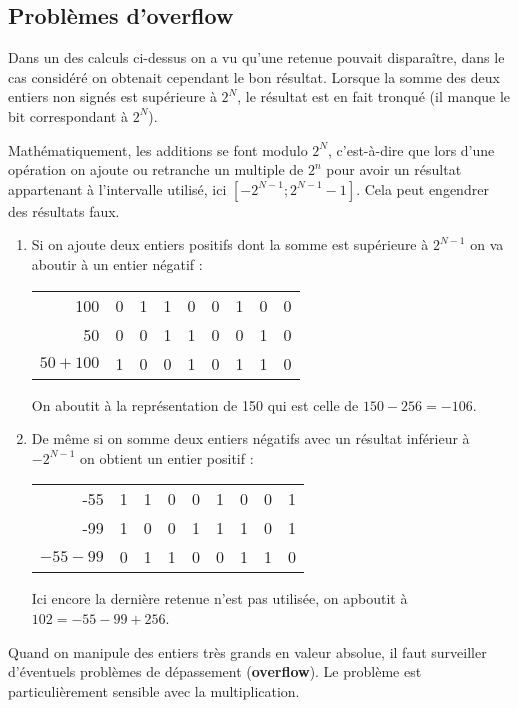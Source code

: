 \subsection{Problèmes d'overflow}
Dans un des calculs ci-dessus on a vu qu'une retenue pouvait disparaître, dans le cas considéré on obtenait cependant le bon résultat. Lorsque la somme des deux entiers non signés est supérieure à $2^N$, le résultat est en fait tronqué (il manque le bit correspondant à $2^N$).

Mathématiquement, les additions se font modulo $2^N$, c'est-à-dire que lors d'une opération on ajoute ou retranche un multiple de $2^n$ pour avoir un résultat appartenant à l'intervalle utilisé, ici $[-2^{N-1}; 2^{N-1}-1]$. Cela peut engendrer des résultats faux.
\begin{enumerate}
\item Si on ajoute deux entiers positifs dont la somme est supérieure à $2^{N-1}$ on va aboutir à un entier négatif :
\begin{center}
\begin{tabular}{r|cccccccc}
100      &0&1&1&0&0&1&0&0\\
50       &0&0&1&1&0&0&1&0\\
$50+100$ &1&0&0&1&0&1&1&0\\
\end{tabular}
\end{center}
On aboutit à la représentation de 150 qui est celle de $150-256 = -106$.
\item De même si on somme deux entiers négatifs avec un résultat inférieur à $-2^{N-1}$ on obtient un entier positif :
\begin{center}
\begin{tabular}{r|cccccccc}
-55       &1&1&0&0&1&0&0&1\\
-99       &1&0&0&1&1&1&0&1\\
$-55-99$  &0&1&1&0&0&1&1&0\\
\end{tabular}
\end{center}
Ici encore la dernière retenue n'est pas utilisée, on apboutit à $102 = -55-99+256$.
\end{enumerate}
\medskip

Quand on manipule des entiers très grands en valeur absolue, il faut surveiller d'éventuels problèmes de dépassement ({\bf overflow}). Le problème est particulièrement sensible avec la multiplication.


